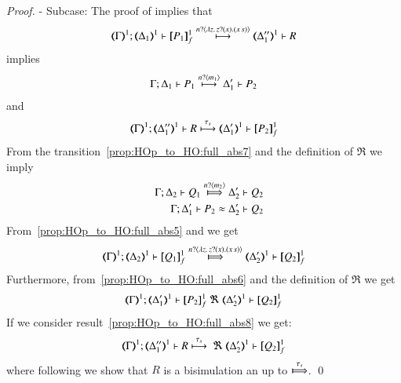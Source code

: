 \begin{proof}
	\noi - Subcase:
	\noi The proof of  implies that
%
	\[
		\horel{\mapt{\Gamma}^{1}}{\mapt{\Delta_1}^{1}}{\pmapp{P_1}{1}{f}}{\hby{\bactinp{n}{\abs{z}{ \binp{z}{x} (\appl{x}{s})}}}}{\mapt{\Delta_1''}^{1}} R %
	\]
%
	\noi implies
%
	\begin{eqnarray}
		\Gamma; \Delta_1 \vdash P_1 \stackrel{n ? \langle m_1 \rangle}{\longmapsto} \Delta_1' \vdash P_2
		\label{prop:HOp_to_HO:full_abs7}
	\end{eqnarray}
%
	\noi and
%
	\begin{eqnarray}
		\horel{\mapt{\Gamma}^{1}}{\mapt{\Delta_1''}^{1}}{R}{\hby{\stau}}{\mapt{\Delta_1'}^{1}}{\pmapp{P_2}{1}{f}}
		\label{prop:HOp_to_HO:full_abs8}
	\end{eqnarray}
%
%
	\noi From the transition~\eqref{prop:HOp_to_HO:full_abs7} and the definition of $\Re$ we imply
%
	\begin{eqnarray}
		&&\horel{\Gamma}{\Delta_2}{Q_1}{\Hby{\bactinp{n}{m_2}}}{\Delta_2'}{Q_2}
		\label{prop:HOp_to_HO:full_abs5}
		\\
		&&\horel{\Gamma}{\Delta_1'}{P_2}{\wb}{\Delta_2'}{Q_2}
		\label{prop:HOp_to_HO:full_abs6}
	\end{eqnarray}
%
	\noi From~\eqref{prop:HOp_to_HO:full_abs5} and  we get
%
	\[
		\horel{\mapt{\Gamma}^{1}}{\mapt{\Delta_2}^{1}}{\pmapp{Q_1}{1}{f}}{\Hby{\bactinp{n}{\abs{z}{\binp{z}{x} (\appl{x}{s})}}}}{\mapt{\Delta_2'}^{1}}{\pmapp{Q_2}{1}{f}}
	\]
%
	\noi Furthermore, from~\ref{prop:HOp_to_HO:full_abs6} and the definition of $\Re$ we get
%
	\[
		\horel{\mapt{\Gamma}^{1}}{\mapt{\Delta_1'}^{1}}{\pmapp{P_2}{1}{f}}{\ \Re\ }{\mapt{\Delta_2'}^{1}}{\pmapp{Q_2}{1}{f}}
	\]
%
	\noi If we consider result~\eqref{prop:HOp_to_HO:full_abs8} we get:
%
	\[
		\horel{\mapt{\Gamma}^{1}}{\mapt{\Delta_1''}^{1}}{R}{\hby{\stau}\ \Re\ }{\mapt{\Delta_2'}^{1}}{\pmapp{Q_2}{1}{f}}
	\]
	where following  we show that $R$ is a bisimulation an up to $\Hby{\stau}$.
	\qed
\end{proof}






